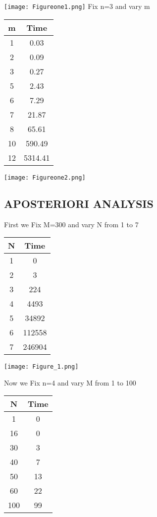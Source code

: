 \documentclass[conference]{IEEEtran}
\begin{document}
\texttt{[image: Figureone1.png]}
\newline
Fix n=3 and vary m
\newline
\begin{center}
   \begin{tabular}{|c|c|}
   \hline
   m & Time \\
   \hline\hline
    1 & 0.03 \\
    \hline
    2 & 0.09 \\
    \hline
    3 & 0.27 \\
    \hline
    5 & 2.43 \\
    \hline
    6 & 7.29 \\
    \hline
    7 & 21.87 \\
    \hline
    8 & 65.61 \\
    \hline
    10 & 590.49 \\
    \hline
    12 & 5314.41 \\
    \hline
    \end{tabular} 
\end{center}
\texttt{[image: Figureone2.png]}
\newline
\subsection{APOSTERIORI ANALYSIS }

First we Fix M=300 and vary N from 1 to 7
\begin{center}
   \begin{tabular}{|c|c|}
   \hline
   N & Time \\
   \hline\hline
    1 & 0 \\
    \hline
    2 & 3 \\
    \hline
    3 & 224 \\
    \hline
    4 & 4493 \\
    \hline
    5 & 34892 \\
    \hline
    6 & 112558 \\
    \hline
    7 & 246904 \\
    \hline
    \end{tabular} 
\end{center}

\texttt{[image: Figure\_1.png]}

Now we Fix n=4 and vary M from 1 to 100

\begin{center}
   \begin{tabular}{|c|c|}
   \hline
   N & Time \\
   \hline\hline
    1 & 0 \\
    \hline
    16 & 0 \\
    \hline
    30 & 3 \\
    \hline
    40 & 7 \\
    \hline
    50 & 13 \\
    \hline
    60 & 22 \\
    \hline
    100 & 99 \\
    \hline
    \end{tabular} 
\end{center}
\end{document}
